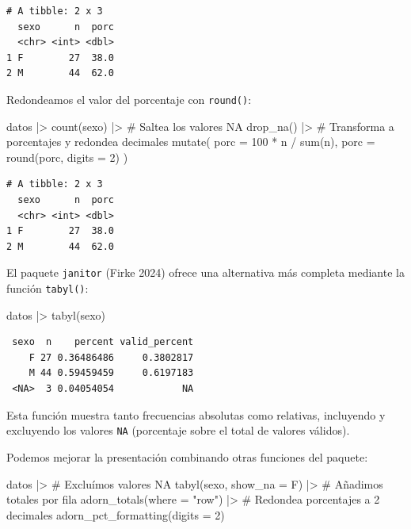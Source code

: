 \documentclass[
  spanish,
  a4paper,
]{scrbook}
\newenvironment{Shaded}{\begin{snugshade}}{\end{snugshade}}
\newcommand{\AttributeTok}[1]{\textcolor[rgb]{0.40,0.45,0.13}{#1}}
\newcommand{\CommentTok}[1]{\textcolor[rgb]{0.37,0.37,0.37}{#1}}
\newcommand{\DecValTok}[1]{\textcolor[rgb]{0.68,0.00,0.00}{#1}}
\newcommand{\FunctionTok}[1]{\textcolor[rgb]{0.28,0.35,0.67}{#1}}
\newcommand{\NormalTok}[1]{\textcolor[rgb]{0.00,0.23,0.31}{#1}}
\newcommand{\SpecialCharTok}[1]{\textcolor[rgb]{0.37,0.37,0.37}{#1}}
\newcommand{\StringTok}[1]{\textcolor[rgb]{0.13,0.47,0.30}{#1}}
\begin{document}
\begin{verbatim}
# A tibble: 2 x 3
  sexo      n  porc
  <chr> <int> <dbl>
1 F        27  38.0
2 M        44  62.0
\end{verbatim}

Redondeamos el valor del porcentaje con \texttt{round()}:

\begin{Shaded}
\begin{Highlighting}[]
\NormalTok{datos }\SpecialCharTok{|\textgreater{}}
  \FunctionTok{count}\NormalTok{(sexo) }\SpecialCharTok{|\textgreater{}}
  \CommentTok{\# Saltea los valores NA}
  \FunctionTok{drop\_na}\NormalTok{() }\SpecialCharTok{|\textgreater{}}
  \CommentTok{\# Transforma a porcentajes y redondea decimales}
  \FunctionTok{mutate}\NormalTok{(}
    \AttributeTok{porc =} \DecValTok{100} \SpecialCharTok{*}\NormalTok{ n }\SpecialCharTok{/} \FunctionTok{sum}\NormalTok{(n),}
    \AttributeTok{porc =} \FunctionTok{round}\NormalTok{(porc, }\AttributeTok{digits =} \DecValTok{2}\NormalTok{)}
\NormalTok{  )}
\end{Highlighting}
\end{Shaded}

\begin{verbatim}
# A tibble: 2 x 3
  sexo      n  porc
  <chr> <int> <dbl>
1 F        27  38.0
2 M        44  62.0
\end{verbatim}

El paquete \texttt{janitor} (Firke 2024) ofrece una alternativa más
completa mediante la función \texttt{tabyl()}:

\begin{Shaded}
\begin{Highlighting}[]
\NormalTok{datos }\SpecialCharTok{|\textgreater{}}
  \FunctionTok{tabyl}\NormalTok{(sexo)}
\end{Highlighting}
\end{Shaded}

\begin{verbatim}
 sexo  n    percent valid_percent
    F 27 0.36486486     0.3802817
    M 44 0.59459459     0.6197183
 <NA>  3 0.04054054            NA
\end{verbatim}

Esta función muestra tanto frecuencias absolutas como relativas,
incluyendo y excluyendo los valores \texttt{NA} (porcentaje sobre el
total de valores válidos).

Podemos mejorar la presentación combinando otras funciones del paquete:

\begin{Shaded}
\begin{Highlighting}[]
\NormalTok{datos }\SpecialCharTok{|\textgreater{}}
  \CommentTok{\# Excluímos valores NA}
  \FunctionTok{tabyl}\NormalTok{(sexo, }\AttributeTok{show\_na =}\NormalTok{ F) }\SpecialCharTok{|\textgreater{}}
  \CommentTok{\# Añadimos totales por fila}
  \FunctionTok{adorn\_totals}\NormalTok{(}\AttributeTok{where =} \StringTok{"row"}\NormalTok{) }\SpecialCharTok{|\textgreater{}}
  \CommentTok{\# Redondea porcentajes a 2 decimales}
  \FunctionTok{adorn\_pct\_formatting}\NormalTok{(}\AttributeTok{digits =} \DecValTok{2}\NormalTok{)}
\end{Highlighting}
\end{Shaded}
\end{document}
